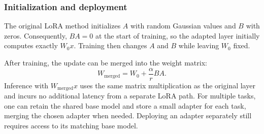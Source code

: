 \subsubsection{Initialization and deployment}

The original LoRA method initializes $A$ with random Gaussian values and $B$ with zeros. Consequently, $BA=0$ at the start of training, so the adapted layer initially computes exactly $W_0x$. Training then changes $A$ and $B$ while leaving $W_0$ fixed.

After training, the update can be merged into the weight matrix:
\[
W_{\mathrm{merged}}=W_0+\frac{\alpha}{r}BA.
\]
Inference with $W_{\mathrm{merged}}x$ uses the same matrix multiplication as the original layer and incurs no additional latency from a separate LoRA path. For multiple tasks, one can retain the shared base model and store a small adapter for each task, merging the chosen adapter when needed. Deploying an adapter separately still requires access to its matching base model.
